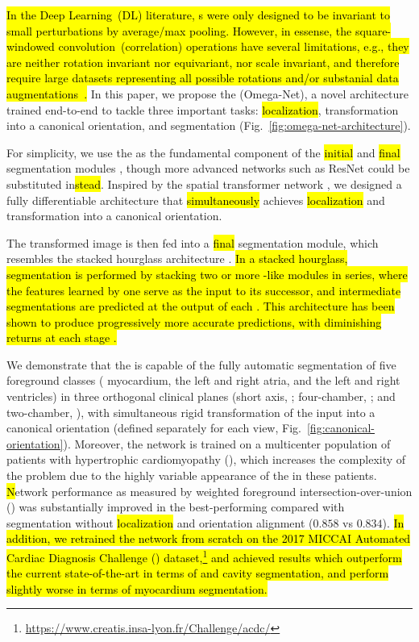 

\hl{
In the Deep Learning~(DL) literature, \CNN{}s were only designed to be invariant to small perturbations by average/max pooling.
However, in essense, the square-windowed convolution~(correlation) operations have several limitations, e.g., they are neither rotation invariant nor equivariant, nor scale invariant, and therefore require large datasets representing all possible rotations and/or substanial data augmentations~\citep{Sifre2013, Dieleman2015}.
}
In this paper, we propose the \omeganet{} (Omega-Net), a novel \CNN{} architecture trained end-to-end to tackle three important tasks: \hl{localization}, transformation into a canonical orientation, and segmentation (Fig.~\ref{fig:omega-net-architecture}).

For simplicity, we use the \UNet{} as the fundamental component of the \hl{initial} and \hl{final} segmentation modules \citep{Ronneberger2015}, though more advanced networks such as ResNet \citep{He2016} could be substituted in\hl{stead}.
Inspired by the spatial transformer network \citep{Jaderberg2015}, we designed a fully differentiable architecture that \hl{simultaneously} achieves \hl{localization} and transformation into a canonical orientation.

The transformed image is then fed into a \hl{final} segmentation module, which resembles the stacked hourglass architecture \citep{Newell2016}.
\hl{
In a stacked hourglass, segmentation is performed by stacking two or more \UNet{}-like modules in series, where the features learned by one \UNet{} serve as the input to its successor, and intermediate segmentations are predicted at the output of each \UNet{}.
This architecture has been shown to produce progressively more accurate predictions, with diminishing returns at each stage \citep{Newell2016}.
}

We demonstrate that the \omeganet{} is capable of the fully automatic segmentation of five foreground classes (\LV{} myocardium, the left and right atria, and the left and right ventricles) in three orthogonal clinical planes (short axis, \SA{}; four-chamber, \HLA{}; and two-chamber, \VLA{}), with simultaneous rigid transformation of the input into a canonical orientation (defined separately for each view, Fig.~\ref{fig:canonical-orientation}).
Moreover, the network is trained on a multicenter population \hl{\citep{Ho2017}} of patients with hypertrophic cardiomyopathy (\HCM{}), which increases the complexity of the problem due to the highly variable appearance of the \LV{} in these patients.
\hl{N}etwork performance as measured by weighted foreground intersection-over-union (\IoU{}) was substantially improved in the best-performing \omeganet{} 
compared with \UNet{} segmentation without \hl{localization} and orientation alignment ($0.858$ vs $0.834$).
\hl{
In addition, we retrained the network from scratch on the 2017 MICCAI Automated Cardiac Diagnosis Challenge (\miccaidata{}) dataset,\footnote{\url{https://www.creatis.insa-lyon.fr/Challenge/acdc/}} and achieved results which outperform the current state-of-the-art \citep{Isensee2018} in terms of \LV{} and \RV{} cavity segmentation, and perform slightly worse in terms of \LV{} myocardium segmentation.
}
